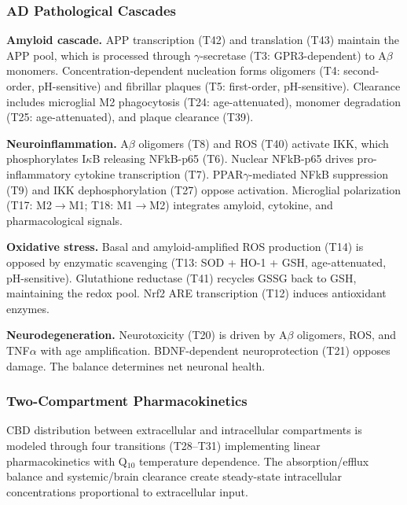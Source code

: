 \documentclass[10pt,letterpaper]{article}
\begin{document}
\subsubsection{AD Pathological Cascades}

\vspace{3pt}
\noindent\textbf{Amyloid cascade.} APP transcription (T42) and translation (T43) maintain the APP pool, which is processed through $\gamma$-secretase (T3: GPR3-dependent) to A$\beta$ monomers. Concentration-dependent nucleation forms oligomers (T4: second-order, pH-sensitive) and fibrillar plaques (T5: first-order, pH-sensitive). Clearance includes microglial M2 phagocytosis (T24: age-attenuated), monomer degradation (T25: age-attenuated), and plaque clearance (T39).

\vspace{3pt}
\noindent\textbf{Neuroinflammation.} A$\beta$ oligomers (T8) and ROS (T40) activate IKK, which phosphorylates I$\kappa$B releasing NFkB-p65 (T6). Nuclear NFkB-p65 drives pro-inflammatory cytokine transcription (T7). PPAR$\gamma$-mediated NFkB suppression (T9) and IKK dephosphorylation (T27) oppose activation. Microglial polarization (T17: M2$\to$M1; T18: M1$\to$M2) integrates amyloid, cytokine, and pharmacological signals.

\vspace{3pt}
\noindent\textbf{Oxidative stress.} Basal and amyloid-amplified ROS production (T14) is opposed by enzymatic scavenging (T13: SOD + HO-1 + GSH, age-attenuated, pH-sensitive). Glutathione reductase (T41) recycles GSSG back to GSH, maintaining the redox pool. Nrf2 ARE transcription (T12) induces antioxidant enzymes.

\vspace{3pt}
\noindent\textbf{Neurodegeneration.} Neurotoxicity (T20) is driven by A$\beta$ oligomers, ROS, and TNF$\alpha$ with age amplification. BDNF-dependent neuroprotection (T21) opposes damage. The balance determines net neuronal health.

\subsubsection{Two-Compartment Pharmacokinetics}

CBD distribution between extracellular and intracellular compartments is modeled through four transitions (T28--T31) implementing linear pharmacokinetics with Q$_{10}$ temperature dependence. The absorption/efflux balance and systemic/brain clearance create steady-state intracellular concentrations proportional to extracellular input.
\end{document}
